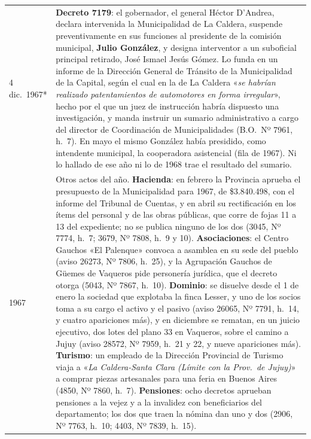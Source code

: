 \begin{longtable}{@{}p{2.7cm}p{10.3cm}@{}}
4 dic.\ 1967* & \textbf{Decreto 7179}: el gobernador, el general Héctor D'Andrea, declara intervenida la Municipalidad de La Caldera, suspende preventivamente en sus funciones al presidente de la comisión municipal, \textbf{Julio González}, y designa interventor a un suboficial principal retirado, José Ismael Jesús Gómez. Lo funda en un informe de la Dirección General de Tránsito de la Municipalidad de la Capital, según el cual en la de La Caldera «\textit{se habrían realizado patentamientos de automotores en forma irregular}», hecho por el que un juez de instrucción habría dispuesto una investigación, y manda instruir un sumario administrativo a cargo del director de Coordinación de Municipalidades (B.O.\ Nº 7961, h.\ 7). En mayo el mismo González había presidido, como intendente municipal, la cooperadora asistencial (fila de 1967). Ni lo hallado de ese año ni lo de 1968 trae el resultado del sumario. \\
1967 & Otros actos del año. \textbf{Hacienda}: en febrero la Provincia aprueba el presupuesto de la Municipalidad para 1967, de \$3.840.498, con el informe del Tribunal de Cuentas, y en abril su rectificación en los ítems del personal y de las obras públicas, que corre de fojas 11 a 13 del expediente; no se publica ninguno de los dos (3045, Nº 7774, h.\ 7; 3679, Nº 7808, h.\ 9 y 10). \textbf{Asociaciones}: el Centro Gauchos «El Palenque» convoca a asamblea en su sede del pueblo (aviso 26273, Nº 7806, h.\ 25), y la Agrupación Gauchos de Güemes de Vaqueros pide personería jurídica, que el decreto otorga (5043, Nº 7867, h.\ 10). \textbf{Dominio}: se disuelve desde el 1 de enero la sociedad que explotaba la finca Lesser, y uno de los socios toma a su cargo el activo y el pasivo (aviso 26065, Nº 7791, h.\ 14, y cuatro apariciones más), y en diciembre se rematan, en un juicio ejecutivo, dos lotes del plano 33 en Vaqueros, sobre el camino a Jujuy (aviso 28572, Nº 7959, h.\ 21 y 22, y nueve apariciones más). \textbf{Turismo}: un empleado de la Dirección Provincial de Turismo viaja a «\textit{La Caldera-Santa Clara (Límite con la Prov.\ de Jujuy)}» a comprar piezas artesanales para una feria en Buenos Aires (4850, Nº 7860, h.\ 7). \textbf{Pensiones}: ocho decretos aprueban pensiones a la vejez y a la invalidez con beneficiarios del departamento; los dos que traen la nómina dan uno y dos (2906, Nº 7763, h.\ 10; 4403, Nº 7839, h.\ 15). \\

\end{longtable}
